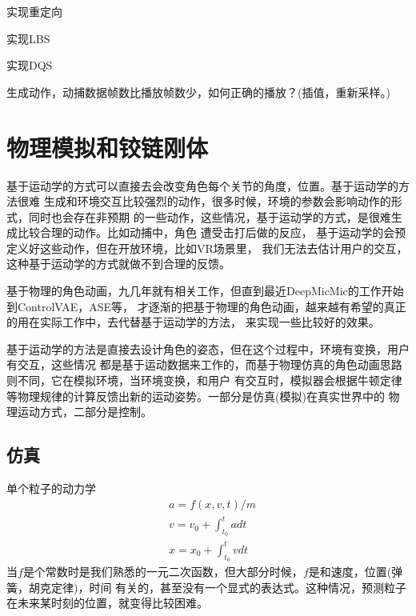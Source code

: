 \documentclass[lang=cn,newtx,10pt,scheme=chinese]{elegantbook}
\begin{document}
\begin{problemset}
  \item 实现重定向
  \item 实现LBS
  \item 实现DQS
  \item 生成动作，动捕数据帧数比播放帧数少，如何正确的播放？(插值，重新采样。)
\end{problemset}

\chapter{物理模拟和铰链刚体}
基于运动学的方式可以直接去会改变角色每个关节的角度，位置。基于运动学的方法很难
生成和环境交互比较强烈的动作，很多时候，环境的参数会影响动作的形式，同时也会存在非预期
的一些动作，这些情况，基于运动学的方式，是很难生成比较合理的动作。比如动捕中，角色
遭受击打后做的反应， 基于运动学的会预定义好这些动作，但在开放环境，比如VR场景里，
我们无法去估计用户的交互，这种基于运动学的方式就做不到合理的反馈。

基于物理的角色动画，九几年就有相关工作，但直到最近DeepMicMic的工作开始到ControlVAE，ASE等，
才逐渐的把基于物理的角色动画，越来越有希望的真正的用在实际工作中，去代替基于运动学的方法，
来实现一些比较好的效果。

基于运动学的方法是直接去设计角色的姿态，但在这个过程中，环境有变换，用户有交互，这些情况
都是基于运动数据来工作的，而基于物理仿真的角色动画思路则不同，它在模拟环境，当环境变换，和用户
有交互时，模拟器会根据牛顿定律等物理规律的计算反馈出新的运动姿势。一部分是仿真(模拟)在真实世界中的
物理运动方式，二部分是控制。

\section{仿真}
单个粒子的动力学
\begin{equation}
  \begin{aligned}
  & a=f(x, v, t) / m \\
  & v=v_0+\int_{t_0}^t a d t \\
  & x=x_0+\int_{t_0}^t v d t
  \end{aligned}
\end{equation}
当$f$是个常数时是我们熟悉的一元二次函数，但大部分时候，$f$是和速度，位置(弹簧，胡克定律)，时间
有关的，甚至没有一个显式的表达式。这种情况，预测粒子在未来某时刻的位置，就变得比较困难。
\end{document}
